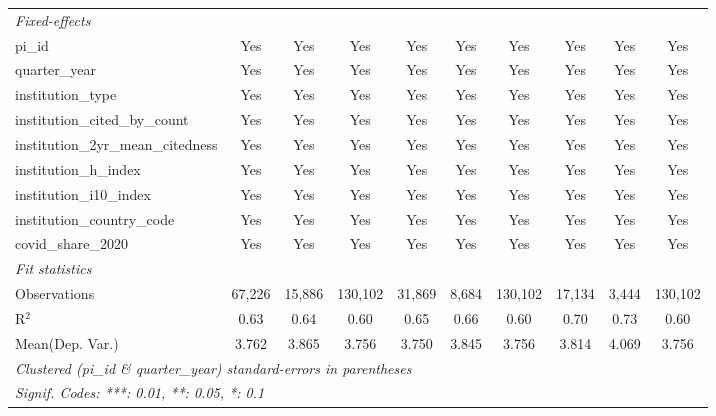 \begin{tabular}{lccccccccc}
   \midrule
   \emph{Fixed-effects}\\
   pi\_id                                                      & Yes           & Yes           & Yes           & Yes          & Yes          & Yes           & Yes            & Yes            & Yes\\  
   quarter\_year                                               & Yes           & Yes           & Yes           & Yes          & Yes          & Yes           & Yes            & Yes            & Yes\\  
   institution\_type                                           & Yes           & Yes           & Yes           & Yes          & Yes          & Yes           & Yes            & Yes            & Yes\\  
   institution\_cited\_by\_count                               & Yes           & Yes           & Yes           & Yes          & Yes          & Yes           & Yes            & Yes            & Yes\\  
   institution\_2yr\_mean\_citedness                           & Yes           & Yes           & Yes           & Yes          & Yes          & Yes           & Yes            & Yes            & Yes\\  
   institution\_h\_index                                       & Yes           & Yes           & Yes           & Yes          & Yes          & Yes           & Yes            & Yes            & Yes\\  
   institution\_i10\_index                                     & Yes           & Yes           & Yes           & Yes          & Yes          & Yes           & Yes            & Yes            & Yes\\  
   institution\_country\_code                                  & Yes           & Yes           & Yes           & Yes          & Yes          & Yes           & Yes            & Yes            & Yes\\  
   covid\_share\_2020                                          & Yes           & Yes           & Yes           & Yes          & Yes          & Yes           & Yes            & Yes            & Yes\\  
   \midrule
   \emph{Fit statistics}\\
   Observations                                                & 67,226        & 15,886        & 130,102       & 31,869       & 8,684        & 130,102       & 17,134         & 3,444          & 130,102\\  
   R$^2$                                                       & 0.63          & 0.64          & 0.60          & 0.65         & 0.66         & 0.60          & 0.70           & 0.73           & 0.60\\  
Mean(Dep. Var.) & 3.762 & 3.865 & 3.756 & 3.750 & 3.845 & 3.756 & 3.814 & 4.069 & 3.756 \\
   \midrule \midrule
   \multicolumn{10}{l}{\emph{Clustered (pi\_id \& quarter\_year) standard-errors in parentheses}}\\
   \multicolumn{10}{l}{\emph{Signif. Codes: ***: 0.01, **: 0.05, *: 0.1}}\\
\end{tabular}
\par\endgroup
